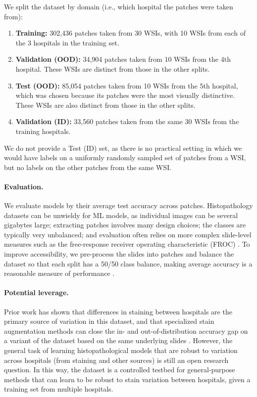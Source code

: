 We split the dataset by domain (i.e., which hospital the patches were taken from):
\begin{enumerate}
  \item \textbf{Training:} 302,436 patches taken from 30 WSIs, with 10 WSIs from each of the 3 hospitals in the training set.
  \item \textbf{Validation (OOD):} 34,904 patches taken from 10 WSIs from the 4th hospital. These WSIs are distinct from those in the other splits.
  \item \textbf{Test (OOD):} 85,054 patches taken from 10 WSIs from the 5th hospital, which was chosen because its patches were the most visually distinctive. These WSIs are also distinct from those in the other splits.
  \item \textbf{Validation (ID):} 33,560 patches taken from the same 30 WSIs from the training hospitals.
\end{enumerate}
We do not provide a Test (ID) set, as there is no practical setting in which we would have labels on a uniformly randomly sampled set of patches from a WSI, but no labels on the other patches from the same WSI.


\paragraph{Evaluation.}
We evaluate models by their average test accuracy across patches. Histopathology datasets can be unwieldy for ML models, as individual images can be several gigabytes large; extracting patches involves many design choices; the classes are typically very unbalanced; and evaluation often relies on more complex slide-level measures such as the free-response receiver operating characteristic (FROC) \citep{gurcan2009histopathological}.
To improve accessibility, we pre-process the slides into patches and balance the dataset so that each split has a 50/50 class balance, making average accuracy is a reasonable measure of performance \citep{veeling2018rotation, tellez2019quantifying}.

\paragraph{Potential leverage.}
Prior work has shown that differences in staining between hospitals are the primary source of variation in this dataset, and that specialized stain augmentation methods can close the in- and out-of-distribution accuracy gap on a variant of the dataset based on the same underlying slides \citep{tellez2019quantifying}.
However, the general task of learning histopathological models that are robust to variation across hospitals (from staining and other sources) is still an open research question.
In this way, the \Camelyon dataset is a controlled testbed for general-purpose methods that can learn to be robust to stain variation between hospitals, given a training set from multiple hospitals.



